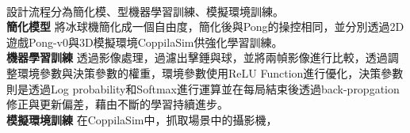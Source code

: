 \begin{flushleft}
{\large {}}\\
\end{flushleft}
設計流程分為簡化模、型機器學習訓練、模擬環境訓練。\\
\textbf{簡化模型}
將冰球機簡化成一個自由度，簡化後與Pong的操控相同，並分別透過2D遊戲Pong-v0與3D模擬環境CoppilaSim供強化學習訓練。\\

\textbf{機器學習訓練}
透過影像處理，過濾出擊錘與球，並將兩幀影像進行比較，透過調整環境參數與決策參數的權重，環境參數使用ReLU Function進行優化，決策參數則是透過Log probability和Softmax進行運算並在每局結束後透過back-propgation修正與更新偏差，藉由不斷的學習持續進步。\\

\textbf{模擬環境訓練}
在CoppilaSim中，抓取場景中的攝影機，